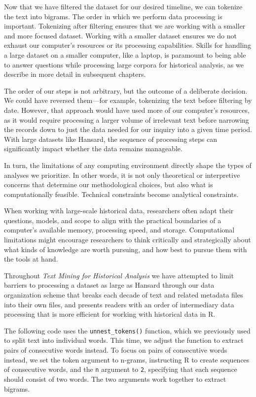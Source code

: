 \documentclass[
]{article}
\newcounter{chapter}
\begin{document}
Now that we have filtered the dataset for our desired timeline, we can
tokenize the text into bigrams. The order in which we perform data
processing is important. Tokenizing after filtering ensures that we are
working with a smaller and more focused dataset. Working with a smaller
dataset ensures we do not exhaust our computer's resources or its
processing capabilities. Skills for handling a large dataset on a
smaller computer, like a laptop, is paramount to being able to answer
questions while processing large corpora for historical analysis, as we
describe in more detail in subsequent chapters.

The order of our steps is not arbitrary, but the outcome of a deliberate
decision. We could have reversed them---for example, tokenizing the text
before filtering by date. However, that approach would have used more of
our computer's resources, as it would require processing a larger volume
of irrelevant text before narrowing the records down to just the data
needed for our inquiry into a given time period. With large datasets
like Hansard, the sequence of processing steps can significantly impact
whether the data remains manageable.

In turn, the limitations of any computing environment directly shape the
types of analyses we prioritize. In other words, it is not only
theoretical or interpretive concerns that determine our methodological
choices, but also what is computationally feasible. Technical
constraints become analytical constraints.

When working with large-scale historical data, researchers often adapt
their questions, models, and scope to align with the practical
boundaries of a computer's available memory, processing speed, and
storage. Computational limitations might encourage researchers to think
critically and strategically about what kinds of knowledge are worth
pursuing, and how best to pursue them with the tools at hand.

Throughout \emph{Text Mining for Historical Analysis} we have attempted
to limit barriers to processing a dataset as large as Hansard through
our data organization scheme that breaks each decade of text and related
metadata files into their own files, and presents readers with an order
of intermediary data processing that is more efficient for working with
historical data in R.

The following code uses the \texttt{unnest\_tokens()} function, which we
previously used to split text into individual words. This time, we
adjust the function to extract pairs of consecutive words instead. To
focus on pairs of consecutive words instead, we set the token argument
to n-grams, instructing R to create sequences of consecutive words, and
the \texttt{n} argument to \texttt{2}, specifying that each sequence
should consist of two words. The two arguments work together to extract
bigrams.
\end{document}
